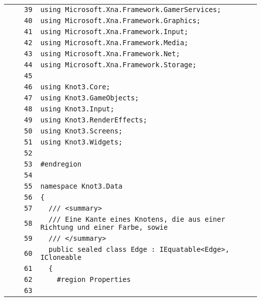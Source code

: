 \documentclass[a4paper,10pt]{article}
\begin{document}
\begin{longtable}[l]{lrrl}
\cellcolor{gray} &  & \verb~39~ & \verb~using Microsoft.Xna.Framework.GamerServices;~\\
\cellcolor{gray} &  & \verb~40~ & \verb~using Microsoft.Xna.Framework.Graphics;~\\
\cellcolor{gray} &  & \verb~41~ & \verb~using Microsoft.Xna.Framework.Input;~\\
\cellcolor{gray} &  & \verb~42~ & \verb~using Microsoft.Xna.Framework.Media;~\\
\cellcolor{gray} &  & \verb~43~ & \verb~using Microsoft.Xna.Framework.Net;~\\
\cellcolor{gray} &  & \verb~44~ & \verb~using Microsoft.Xna.Framework.Storage;~\\
\cellcolor{gray} &  & \verb~45~ & \verb~~\\
\cellcolor{gray} &  & \verb~46~ & \verb~using Knot3.Core;~\\
\cellcolor{gray} &  & \verb~47~ & \verb~using Knot3.GameObjects;~\\
\cellcolor{gray} &  & \verb~48~ & \verb~using Knot3.Input;~\\
\cellcolor{gray} &  & \verb~49~ & \verb~using Knot3.RenderEffects;~\\
\cellcolor{gray} &  & \verb~50~ & \verb~using Knot3.Screens;~\\
\cellcolor{gray} &  & \verb~51~ & \verb~using Knot3.Widgets;~\\
\cellcolor{gray} &  & \verb~52~ & \verb~~\\
\cellcolor{gray} &  & \verb~53~ & \verb~#endregion~\\
\cellcolor{gray} &  & \verb~54~ & \verb~~\\
\cellcolor{gray} &  & \verb~55~ & \verb~namespace Knot3.Data~\\
\cellcolor{gray} &  & \verb~56~ & \verb~{~\\
\cellcolor{gray} &  & \verb~57~ & \verb~  /// <summary>~\\
\cellcolor{gray} &  & \verb~58~ & \verb~  /// Eine Kante eines Knotens, die aus einer Richtung und einer Farbe, sowie ~\\
\cellcolor{gray} &  & \verb~59~ & \verb~  /// </summary>~\\
\cellcolor{gray} &  & \verb~60~ & \verb~  public sealed class Edge : IEquatable<Edge>, ICloneable~\\
\cellcolor{gray} &  & \verb~61~ & \verb~  {~\\
\cellcolor{gray} &  & \verb~62~ & \verb~    #region Properties~\\
\cellcolor{gray} &  & \verb~63~ & \verb~~\\

\end{longtable}
\end{document}
